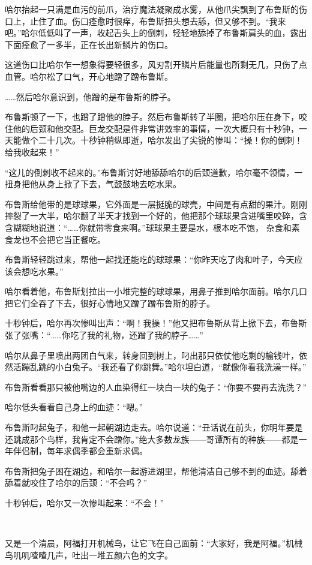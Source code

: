 \documentclass[../main.tex]{subfiles}
\begin{document}
哈尔抬起一只满是血污的前爪，治疗魔法凝聚成水雾，从他爪尖飘到了布鲁斯的伤口上，止住了血。伤口痊愈时很痒，布鲁斯扭头想去舔，但又够不到。“我来吧。”哈尔低低叫了一声，收起舌头上的倒刺，轻轻地舔掉了布鲁斯肩头的血，露出下面痊愈了一多半，正在长出新鳞片的伤口。

这道伤口比哈尔乍一想象得要轻很多，风刃割开鳞片后能量也所剩无几，只伤了点血管。哈尔松了口气，开心地蹭了蹭布鲁斯。

……然后哈尔意识到，他蹭的是布鲁斯的脖子。

布鲁斯顿了一下，也蹭了蹭他的脖子。然后布鲁斯转了半圈，把哈尔压在身下，咬住他的后颈和他交配。巨龙交配是件非常讲效率的事情，一次大概只有十秒钟，一天能做个二十几次。十秒钟稍纵即逝，哈尔发出了尖锐的惨叫：“操！你的倒刺！给我收起来！”

“这儿的倒刺收不起来的。”布鲁斯讨好地舔舔哈尔的后颈道歉，哈尔毫不领情，一扭身把他从身上掀了下去，气鼓鼓地去吃水果。

布鲁斯给他带的是球球果，它外面是一层挺脆的球壳，中间是有点甜的果汁。刚刚摔裂了一大半，哈尔翻了半天才找到一个好的，他把那个球球果含进嘴里咬碎，含含糊糊地说道：“……你就带零食来啊。”球球果主要是水，根本吃不饱，
杂食和素食龙也不会把它当正餐吃。

布鲁斯轻轻跳过来，帮他一起找还能吃的球球果：“你昨天吃了肉和叶子，今天应该会想吃水果。”

哈尔看着他，布鲁斯划拉出一小堆完整的球球果，用鼻子推到哈尔面前。哈尔几口把它们全吞了下去，很好心情地又蹭了蹭布鲁斯的脖子。

十秒钟后，哈尔再次惨叫出声：“啊！我操！”他又把布鲁斯从背上掀下去，布鲁斯张了张嘴：“……你吃了我的礼物，还蹭了我的脖子……”

哈尔从鼻子里喷出两团白气来，转身回到树上，叼出那只依仗他吃剩的榆钱叶，依然活蹦乱跳的小白兔子。“我还看了你跳舞。”哈尔坦白道，“就像你看我洗澡一样。”

布鲁斯看看那只被他嘴边的人血染得红一块白一块的兔子：“你要不要再去洗洗？”

哈尔低头看看自己身上的血迹：“嗯。”

布鲁斯叼起兔子，和他一起朝湖边走去。哈尔说道：“丑话说在前头，你明年要是还跳成那个鸟样，我肯定不会蹭你。”绝大多数龙族——哥谭所有的种族——都是一年伴侣制，每年求偶季都会重新求偶。

布鲁斯把兔子困在湖边，和哈尔一起游进湖里，帮他清洁自己够不到的血迹。舔着舔着就咬住了哈尔的后颈：“不会吗？”

十秒钟后，哈尔又一次惨叫起来：“不会！”

~\

又是一个清晨，阿福打开机械鸟，让它飞在自己面前：“大家好，我是阿福。”机械鸟叽叽喳喳几声，吐出一堆五颜六色的文字。
\end{document}
